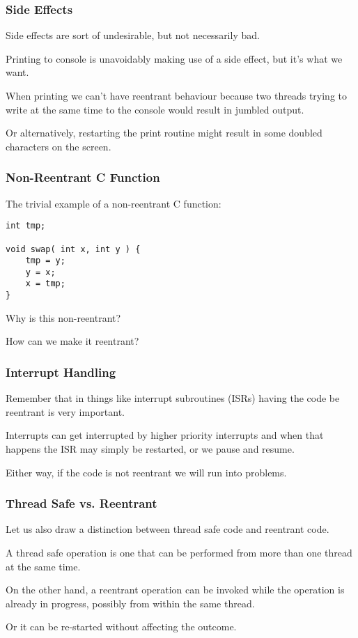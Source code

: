 \begin{frame}
\frametitle{Side Effects}

Side effects are sort of undesirable, but not necessarily bad. 

Printing to console is unavoidably making use of a side effect, but it's what we want. 

When printing we can't have reentrant behaviour because two threads trying to write at the same time to the console would result in jumbled output. 

Or alternatively, restarting the print routine might result in some doubled characters on the screen.

\end{frame}



\begin{frame}[fragile]
\frametitle{Non-Reentrant C Function}

The trivial example of a non-reentrant C function:

\begin{verbatim}
int tmp;

void swap( int x, int y ) {
    tmp = y;
    y = x;
    x = tmp;
}
\end{verbatim}

Why is this non-reentrant?

How can we make it reentrant?

\end{frame}



\begin{frame}
\frametitle{Interrupt Handling}


Remember that in things like interrupt subroutines (ISRs) having the code be reentrant is very important. 

Interrupts can get interrupted by higher priority interrupts and when that happens the ISR may simply be restarted, or we pause and resume.

Either way, if the code is not reentrant we will run into problems.


\end{frame}

\begin{frame}
\frametitle{Thread Safe vs. Reentrant}

Let us also draw a distinction between thread safe code and reentrant code. 

A thread safe operation is one that can be performed from more than one thread at the same time. 

On the other hand, a reentrant operation can be invoked while the operation is already in progress, possibly from within the same thread. 

Or it can be re-started without affecting the outcome. 

\end{frame}



